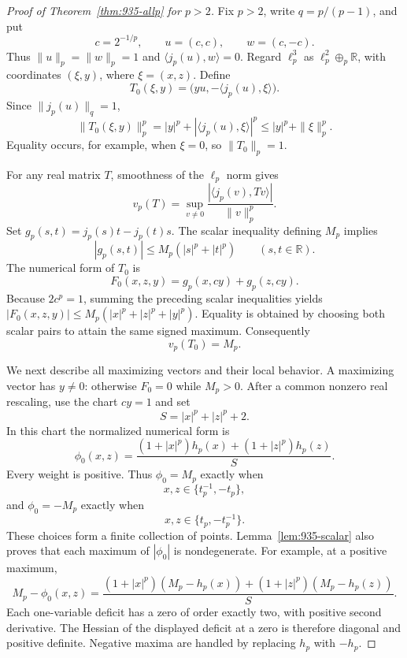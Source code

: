 \documentclass[11pt,a4paper]{article}
\theoremstyle{remark}
\begin{document}
\begin{proof}[Proof of Theorem~\ref{thm:935-allp} for $p>2$]
Fix $p>2$, write $q=p/(p-1)$, and put
\[
 c=2^{-1/p},\qquad u=(c,c),\qquad w=(c,-c).
\]
Thus $\|u\|_p=\|w\|_p=1$ and
$\langle j_p(u),w\rangle=0$. Regard $\ell_p^3$ as
$\ell_p^2\oplus_p\mathbb R$, with coordinates $(\xi,y)$, where
$\xi=(x,z)$. Define
\[
 T_0(\xi,y)=\bigl(yu,-\langle j_p(u),\xi\rangle\bigr).
\]
Since $\|j_p(u)\|_q=1$,
\[
 \|T_0(\xi,y)\|_p^p
 =|y|^p+|\langle j_p(u),\xi\rangle|^p
 \le |y|^p+\|\xi\|_p^p.
\]
Equality occurs, for example, when $\xi=0$, so $\|T_0\|_p=1$.

For any real matrix $T$, smoothness of the $\ell_p$ norm gives
\[
 v_p(T)=\sup_{v\ne0}
 \frac{|\langle j_p(v),Tv\rangle|}{\|v\|_p^p}.
 \tag{935.G1}\label{eq:935-general-radius}
\]
Set $g_p(s,t)=j_p(s)t-j_p(t)s$. The scalar inequality defining $M_p$
implies
\[
 |g_p(s,t)|\le M_p(|s|^p+|t|^p)
 \qquad(s,t\in\mathbb R).
\]
The numerical form of $T_0$ is
\[
 F_0(x,z,y)=g_p(x,cy)+g_p(z,cy).
\]
Because $2c^p=1$, summing the preceding scalar inequalities yields
$|F_0(x,z,y)|\le M_p(|x|^p+|z|^p+|y|^p)$. Equality is obtained by choosing
both scalar pairs to attain the same signed maximum. Consequently
\[
 v_p(T_0)=M_p.
 \tag{935.G2}\label{eq:935-star-radius}
\]

We next describe all maximizing vectors and their local behavior.
A maximizing vector has $y\ne0$: otherwise $F_0=0$ while $M_p>0$.
After a common nonzero real rescaling, use the chart $cy=1$ and set
\[
 S=|x|^p+|z|^p+2.
\]
In this chart the normalized numerical form is
\[
 \phi_0(x,z)
 =\frac{(1+|x|^p)h_p(x)+(1+|z|^p)h_p(z)}{S}.
 \tag{935.G3}\label{eq:935-star-chart}
\]
Every weight is positive. Thus $\phi_0=M_p$ exactly when
\[
 x,z\in\{t_p^{-1},-t_p\},
\]
and $\phi_0=-M_p$ exactly when
\[
 x,z\in\{t_p,-t_p^{-1}\}.
\]
These choices form a finite collection of points. Lemma~\ref{lem:935-scalar} also proves
that each maximum of $|\phi_0|$ is nondegenerate. For example, at a positive
maximum,
\[
 M_p-\phi_0(x,z)
 =\frac{(1+|x|^p)(M_p-h_p(x))
       +(1+|z|^p)(M_p-h_p(z))}{S}.
\]
Each one-variable deficit has a zero of order exactly two, with positive
second derivative. The Hessian of the displayed deficit at a zero is
therefore diagonal and positive definite. Negative maxima are handled
by replacing $h_p$ with $-h_p$.


\end{proof}
\end{document}

